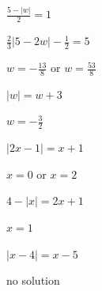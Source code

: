 \documentclass{ximera}
\begin{document}
\begin{question}
\begin{problem}
$\frac{5 - |w|}{2} = 1$

\begin{selectAll}
\end{selectAll}
\end{problem}

\begin{problem}
$\frac{2}{3} |5-2w| - \frac{1}{2} = 5$

\begin{solution}
$w = -\frac{13}{8}$ or $w = \frac{53}{8}$
\end{solution}
\end{problem}

\begin{problem}
$|w| = w + 3$

\begin{solution}
$w =-\frac{3}{2}$
\end{solution}
\end{problem}

\begin{problem}
$|2x-1| = x+1$

\begin{solution}
$x=0$ or $x= 2$
\end{solution}
\end{problem}

\begin{problem}
$4 - |x| = 2x+1$

\begin{solution}
$x=1$
\end{solution}
\end{problem}

\begin{problem}\label{solveabsvalequlasta}
$|x-4| = x-5$

\begin{solution}
no solution
\end{solution}
\end{problem}  
\end{question}
\end{document}
